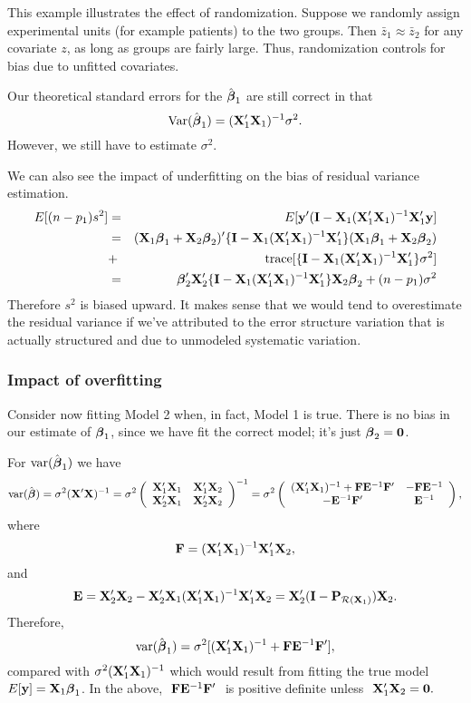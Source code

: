 This example illustrates the effect of randomization.
Suppose we randomly assign experimental units (for example patients)
to the two groups.  Then $\bar{z}_1\approx\bar{z}_2$ for any covariate
$z$, as long as groups are fairly large.  Thus, randomization controls
for bias due to unfitted covariates.


Our theoretical standard errors for the $\hat {\boldsymbol{\beta}}_1$ are still correct in that
$$
\mbox{Var}(\hat {\boldsymbol{\beta}}_1) = (\mathbf{X}_1' \mathbf{X}_1)^{-1} \sigma^2.
$$
However, we still have to estimate $\sigma^2$. 

We can also see the  impact of underfitting on the bias of residual variance estimation.
\begin{eqnarray*}
E[(n- p_1) s^2] & = & E[\mathbf{y}' (\mathbf{I} -  \mathbf{X}_1 (\mathbf{X}_1' \mathbf{X}_1)^{-1} \mathbf{X}_1' \mathbf{y}] \\
& = &(\mathbf{X}_1\boldsymbol{\beta}_1 + \mathbf{X}_2 \boldsymbol{\beta}_2)'\{\mathbf{I} -  \mathbf{X}_1 (\mathbf{X}_1' \mathbf{X}_1)^{-1} \mathbf{X}_1'\} (\mathbf{X}_1\boldsymbol{\beta}_1 + \mathbf{X}_2 \boldsymbol{\beta}_2) \\
& + & \mathrm{trace}[\{\mathbf{I} -  \mathbf{X}_1 (\mathbf{X}_1' \mathbf{X}_1)^{-1} \mathbf{X}_1' \} \sigma^2] \\
& = & \boldsymbol{\beta}_2' \mathbf{X}_2' \{\mathbf{I} -  \mathbf{X}_1 (\mathbf{X}_1' \mathbf{X}_1)^{-1} \mathbf{X}_1'\} \mathbf{X}_2 \boldsymbol{\beta}_2 + (n - p_1) \sigma^2
\end{eqnarray*}
Therefore $s^2$ is biased upward. It makes sense that we would tend to overestimate the residual
variance if we've attributed to the error structure variation that is actually structured and
due to unmodeled systematic variation.


\subsubsection{Impact of overfitting}
Consider now fitting Model 2 when, in fact, Model 1 is true. There
is no bias in our estimate of $\boldsymbol{\beta}_1$, since we have fit the correct model;
it's just $\boldsymbol{\beta}_2 = \mathbf{0}$.  

For $\mathrm{var}(\hat{\mbox{\boldmath $\beta$}}_1)$ we have
$$
\mathrm{var}(\hat{\mbox{\boldmath $\beta$}})
= \sigma^2(\mathbf{X}'\mathbf{X})^{-1}
= \sigma^2\left(\begin{array}{cc}
	\mathbf{X}'_1\mathbf{X}_1&\mathbf{X}'_1\mathbf{X}_2\\
	\mathbf{X}'_2\mathbf{X}_1&\mathbf{X}'_2\mathbf{X}_2
\end{array}\right)^{-1}
= \sigma^2\left(\begin{array}{cc}
	(\mathbf{X}'_1\mathbf{X}_1)^{-1}+\mathbf{F}\mathbf{E}^{-1}\mathbf{F}'&-\mathbf{F}\mathbf{E}^{-1}\\
	-\mathbf{E}^{-1}\mathbf{F}'&\mathbf{E}^{-1}
\end{array}\right),
$$
where 
$$
\mathbf{F}=(\mathbf{X}'_1\mathbf{X}_1)^{-1}\mathbf{X}'_1\mathbf{X}_2,
$$
and
$$
\mathbf{E}
= \mathbf{X}'_2\mathbf{X}_2-\mathbf{X}'_2\mathbf{X}_1(\mathbf{X}'_1\mathbf{X}_1)^{-1}\mathbf{X}'_1\mathbf{X}_2
= \mathbf{X}'_2(\mathbf{I}-\mathbf{P}_{{\cal R}(\mathbf{X}_1)})\mathbf{X}_2.
$$
Therefore,
$$
\mathrm{var}(\hat{\mbox{\boldmath $\beta$}}_1)=\sigma^2[(\mathbf{X}'_1\mathbf{X}_1)^{-1}+\mathbf{F}\mathbf{E}^{-1}\mathbf{F}'],
$$
compared with $\sigma^2(\mathbf{X}'_1\mathbf{X}_1)^{-1}$ which would result from
fitting the true model $E[\mathbf{y}]=\mathbf{X}_1\mbox{\boldmath $\beta$}_1$.
In the above, $\ \mathbf{F}\mathbf{E}^{-1}\mathbf{F}'\ $ is positive definite unless $\
\mathbf{X}'_1\mathbf{X}_2=\mathbf{0}.$

